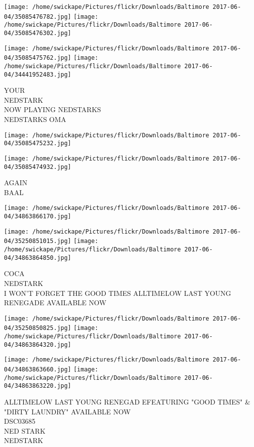 \documentclass[10pt,letterpaper]{article}
\begin{document}
\texttt{[image: /home/swickape/Pictures/flickr/Downloads/Baltimore 2017-06-04/35085476782.jpg]}
\texttt{[image: /home/swickape/Pictures/flickr/Downloads/Baltimore 2017-06-04/35085476302.jpg]}

\texttt{[image: /home/swickape/Pictures/flickr/Downloads/Baltimore 2017-06-04/35085475762.jpg]}
\texttt{[image: /home/swickape/Pictures/flickr/Downloads/Baltimore 2017-06-04/34441952483.jpg]}

YOUR\\
NEDSTARK\\
NOW PLAYING NEDSTARKS\\
NEDSTARKS OMA\\
\pagebreak

\texttt{[image: /home/swickape/Pictures/flickr/Downloads/Baltimore 2017-06-04/35085475232.jpg]}

\vspace{0.25in}
\texttt{[image: /home/swickape/Pictures/flickr/Downloads/Baltimore 2017-06-04/35085474932.jpg]}

AGAIN\\
BAAL\\
\pagebreak

\texttt{[image: /home/swickape/Pictures/flickr/Downloads/Baltimore 2017-06-04/34863866170.jpg]}

\vspace{0.25in}
\texttt{[image: /home/swickape/Pictures/flickr/Downloads/Baltimore 2017-06-04/35250851015.jpg]}
\texttt{[image: /home/swickape/Pictures/flickr/Downloads/Baltimore 2017-06-04/34863864850.jpg]}

COCA\\
NEDSTARK\\
I WON'T FORGET THE GOOD TIMES ALLTIMELOW LAST YOUNG RENEGADE AVAILABLE NOW\\
\pagebreak

\texttt{[image: /home/swickape/Pictures/flickr/Downloads/Baltimore 2017-06-04/35250850825.jpg]}
\texttt{[image: /home/swickape/Pictures/flickr/Downloads/Baltimore 2017-06-04/34863864320.jpg]}

\texttt{[image: /home/swickape/Pictures/flickr/Downloads/Baltimore 2017-06-04/34863863660.jpg]}
\texttt{[image: /home/swickape/Pictures/flickr/Downloads/Baltimore 2017-06-04/34863863220.jpg]}

ALLTIMELOW LAST YOUNG RENEGAD EFEATURING "GOOD TIMES" \& "DIRTY LAUNDRY" AVAILABLE NOW\\
DSC03685\\
NED STARK\\
NEDSTARK\\
\pagebreak
\end{document}
